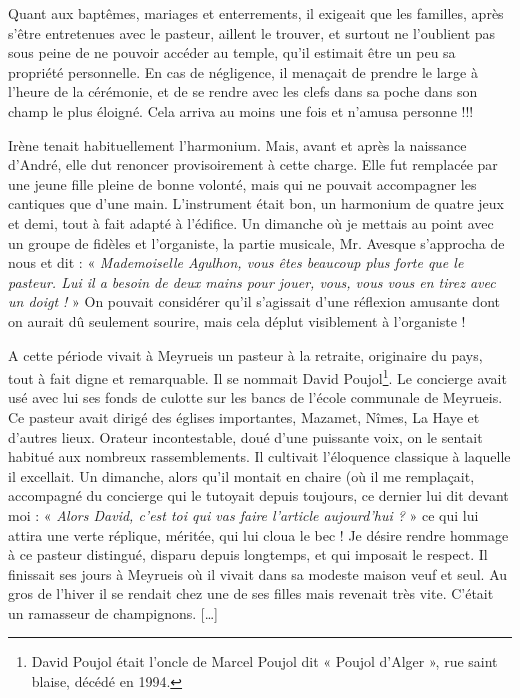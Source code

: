Quant aux baptêmes, mariages et enterrements, il exigeait que les familles, après
s’être entretenues avec le pasteur, aillent le trouver, et surtout ne l’oublient pas sous
peine de ne pouvoir accéder au temple, qu’il estimait être un peu sa propriété
personnelle. En cas de négligence, il menaçait de prendre le large à l’heure de la
cérémonie, et de se rendre avec les clefs dans sa poche dans son champ le plus
éloigné. Cela arriva au moins une fois et n’amusa personne !!!

Irène tenait habituellement l’harmonium. Mais, avant et après la naissance d’André,
elle dut renoncer provisoirement à cette charge. Elle fut remplacée par une jeune fille
pleine de bonne volonté, mais qui ne pouvait accompagner les cantiques que d’une
main. L’instrument était bon, un harmonium de quatre jeux et demi, tout à fait adapté
à l’édifice. Un dimanche où je mettais au point avec un groupe de fidèles et
l’organiste, la partie musicale, Mr. Avesque s’approcha de nous et dit :
« \emph{Mademoiselle Agulhon, vous êtes beaucoup plus forte que le pasteur. Lui il a
besoin de deux mains pour jouer, vous, vous vous en tirez avec un doigt !} » On
pouvait considérer qu’il s’agissait d’une réflexion amusante dont on aurait dû
seulement sourire, mais cela déplut visiblement à l’organiste !

A cette période vivait à Meyrueis un pasteur à la retraite, originaire du pays, tout à
fait digne et remarquable. Il se nommait David Poujol\footnote{David Poujol était l’oncle de Marcel Poujol dit « Poujol d’Alger », rue saint blaise, décédé en 1994.}. Le concierge avait usé avec
lui ses fonds de culotte sur les bancs de l'école communale de Meyrueis. Ce pasteur
avait dirigé des églises importantes, Mazamet, Nîmes, La Haye et d’autres lieux.
Orateur incontestable, doué d’une puissante voix, on le sentait habitué aux nombreux
rassemblements. Il cultivait l’éloquence classique à laquelle il excellait. Un
dimanche, alors qu’il montait en chaire (où il me remplaçait, accompagné du
concierge qui le tutoyait depuis toujours, ce dernier lui dit devant moi : « \emph{Alors
David, c’est toi qui vas faire l’article aujourd’hui ?} » ce qui lui attira une verte
réplique, méritée, qui lui cloua le bec !
Je désire rendre hommage à ce pasteur distingué, disparu depuis longtemps, et qui
imposait le respect. Il finissait ses jours à Meyrueis où il vivait dans sa modeste
maison veuf et seul. Au gros de l’hiver il se rendait chez une de ses filles mais
revenait très vite. C’était un ramasseur de champignons. [\ldots]

